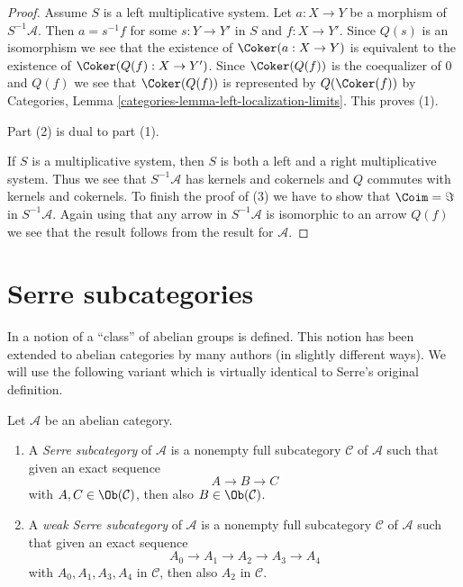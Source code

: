 \begin{proof}
Assume $S$ is a left multiplicative system. Let $a : X \to Y$ be a morphism
of $S^{-1}\mathcal{A}$. Then $a = s^{-1}f$ for some $s : Y \to Y'$
in $S$ and $f : X \to Y'$. Since $Q(s)$ is an isomorphism we see that
the existence of $\Coker(a : X \to Y)$ is equivalent to the existence
of $\Coker(Q(f) : X \to Y')$. Since $\Coker(Q(f))$ is the
coequalizer of $0$ and $Q(f)$ we see that $\Coker(Q(f))$ is
represented by $Q(\Coker(f))$ by
Categories, Lemma \ref{categories-lemma-left-localization-limits}.
This proves (1).

\medskip\noindent
Part (2) is dual to part (1).

\medskip\noindent
If $S$ is a multiplicative system, then $S$ is both a left and a right
multiplicative system. Thus we see that $S^{-1}\mathcal{A}$ has
kernels and cokernels and $Q$ commutes with kernels and cokernels.
To finish the proof of (3) we have to show that $\Coim = \Im$ in
$S^{-1}\mathcal{A}$. Again using that any arrow in $S^{-1}\mathcal{A}$
is isomorphic to an arrow $Q(f)$ we see that the result follows
from the result for $\mathcal{A}$.
\end{proof}



\section{Serre subcategories}
\label{section-serre-subcategories}

\noindent
In \cite[Chapter I, Section 1]{Serre_homotopie_classes}
a notion of a ``class'' of abelian groups is defined.
This notion has been extended to abelian categories by many authors
(in slightly different ways). We will use the following variant
which is virtually identical to Serre's original definition.

\begin{definition}
\label{definition-serre-subcategory}
Let $\mathcal{A}$ be an abelian category.
\begin{enumerate}
\item A {\it Serre subcategory} of $\mathcal{A}$ is a
nonempty full subcategory $\mathcal{C}$ of $\mathcal{A}$
such that given an exact sequence
$$
A \to B \to C
$$
with $A, C \in \Ob(\mathcal{C})$, then also
$B \in \Ob(\mathcal{C})$.
\item A {\it weak Serre subcategory} of $\mathcal{A}$ is a nonempty
full subcategory $\mathcal{C}$ of $\mathcal{A}$ such that given an
exact sequence
$$
A_0 \to A_1 \to A_2 \to A_3 \to A_4
$$
with $A_0, A_1, A_3, A_4$ in $\mathcal{C}$, then also $A_2$ in $\mathcal{C}$.
\end{enumerate}
\end{definition}


